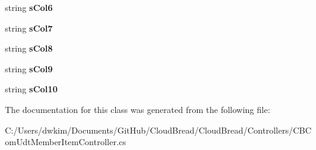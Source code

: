 \begin{DoxyCompactItemize}
\item 
string {\bfseries s\+Col6}\hypertarget{class_cloud_bread_1_1_controllers_1_1_c_b_com_udt_member_item_controller_1_1_input_params_af921de0449adc10868487663d48c3de5}{}\label{class_cloud_bread_1_1_controllers_1_1_c_b_com_udt_member_item_controller_1_1_input_params_af921de0449adc10868487663d48c3de5}

\item 
string {\bfseries s\+Col7}\hypertarget{class_cloud_bread_1_1_controllers_1_1_c_b_com_udt_member_item_controller_1_1_input_params_a6dd8d230b9ed7906970bf88fc022e48e}{}\label{class_cloud_bread_1_1_controllers_1_1_c_b_com_udt_member_item_controller_1_1_input_params_a6dd8d230b9ed7906970bf88fc022e48e}

\item 
string {\bfseries s\+Col8}\hypertarget{class_cloud_bread_1_1_controllers_1_1_c_b_com_udt_member_item_controller_1_1_input_params_a7bf9265aecef0f62323f210ff150839e}{}\label{class_cloud_bread_1_1_controllers_1_1_c_b_com_udt_member_item_controller_1_1_input_params_a7bf9265aecef0f62323f210ff150839e}

\item 
string {\bfseries s\+Col9}\hypertarget{class_cloud_bread_1_1_controllers_1_1_c_b_com_udt_member_item_controller_1_1_input_params_a9cac90b36d02f82e9b19fd8978d3b506}{}\label{class_cloud_bread_1_1_controllers_1_1_c_b_com_udt_member_item_controller_1_1_input_params_a9cac90b36d02f82e9b19fd8978d3b506}

\item 
string {\bfseries s\+Col10}\hypertarget{class_cloud_bread_1_1_controllers_1_1_c_b_com_udt_member_item_controller_1_1_input_params_ad40373e1704c6f0f70c985c59927ff18}{}\label{class_cloud_bread_1_1_controllers_1_1_c_b_com_udt_member_item_controller_1_1_input_params_ad40373e1704c6f0f70c985c59927ff18}

\end{DoxyCompactItemize}


The documentation for this class was generated from the following file\+:\begin{DoxyCompactItemize}
\item 
C\+:/\+Users/dwkim/\+Documents/\+Git\+Hub/\+Cloud\+Bread/\+Cloud\+Bread/\+Controllers/C\+B\+Com\+Udt\+Member\+Item\+Controller.\+cs\end{DoxyCompactItemize}
